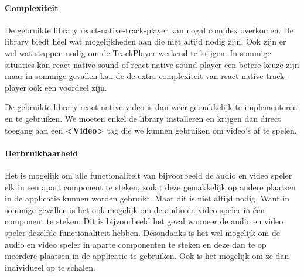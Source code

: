 \paragraph{Complexiteit}
De gebruikte library react-native-track-player kan nogal complex overkomen. De library 
biedt heel wat mogelijkheden aan die niet altijd nodig zijn. Ook zijn er wel wat stappen 
nodig om de TrackPlayer werkend te krijgen. In sommige situaties kan 
react-native-sound of react-native-sound-player een betere keuze zijn maar in sommige gevallen kan de 
de extra complexiteit van react-native-track-player ook een voordeel zijn. 

De gebruikte library react-native-video is dan weer gemakkelijk te implementeren en te gebruiken.
We moeten enkel de library installeren en krijgen dan direct toegang aan een \textbf{<Video>} tag
die we kunnen gebruiken om video's af te spelen.

\paragraph{Herbruikbaarheid}
Het is mogelijk om alle functionaliteit van bijvoorbeeld de audio en video speler elk in een 
apart component te steken, zodat deze gemakkelijk op andere plaatsen in de applicatie kunnen worden 
gebruikt. Maar dit is niet altijd
nodig. Want in sommige gevallen is het ook mogelijk om de audio en video speler in één component
te steken. Dit is bijvoorbeeld het geval wanneer de audio en video speler dezelfde functionaliteit
hebben. Desondanks is het wel mogelijk om de audio en video speler in aparte componenten te steken
en deze dan te op meerdere plaatsen in de applicatie te gebruiken. Ook is het mogelijk om ze dan 
individueel op te schalen.
